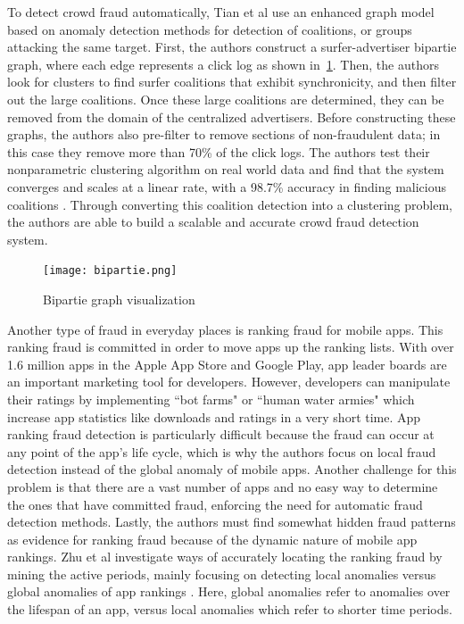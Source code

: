 \documentclass[midd]{thesis}
\begin{document}
To detect crowd fraud automatically, Tian et al use an enhanced graph model based on anomaly detection methods for detection of coalitions, or groups attacking the same target. First, the authors construct a surfer-advertiser bipartie graph, where each edge represents a click log as shown in~\ref{fig:bipartie}. Then, the authors look for clusters to find surfer coalitions that exhibit synchronicity, and then filter out the large coalitions. Once these large coalitions are determined, they can be removed from the domain of the centralized advertisers. Before constructing these graphs, the authors also pre-filter to remove sections of non-fraudulent data; in this case they remove more than 70\% of the click logs. The authors test their nonparametric clustering algorithm on real world data and find that the system converges and scales at a linear rate, with a 98.7\% accuracy in finding malicious coalitions \cite{Tian}. Through converting this coalition detection into a clustering problem, the authors are able to build a scalable and accurate crowd fraud detection system. 

\begin{figure} %
  \texttt{[image: bipartie.png]}
  \caption{Bipartie graph visualization \cite{Tian}}
  \label{fig:bipartie}
\end{figure}

Another type of fraud in everyday places is ranking fraud for mobile apps. This ranking fraud is committed in order to move apps up the ranking lists. With over 1.6 million apps in the Apple App Store and Google Play, app leader boards are an important marketing tool for developers. However, developers can manipulate their ratings by implementing ``bot farms" or ``human water armies" which increase app statistics like downloads and ratings in a very short time. App ranking fraud detection is particularly difficult because the fraud can occur at any point of the app's life cycle, which is why the authors focus on local fraud detection instead of the global anomaly of mobile apps. Another challenge for this problem is that there are a vast number of apps and no easy way to determine the ones that have committed fraud, enforcing the need for automatic fraud detection methods. Lastly, the authors must find somewhat hidden fraud patterns as evidence for ranking fraud because of the dynamic nature of mobile app rankings. Zhu et al investigate ways of accurately locating the ranking fraud by mining the active periods, mainly focusing on detecting local anomalies versus global anomalies of app rankings \cite{Zhu2015}. Here, global anomalies refer to anomalies over the lifespan of an app, versus local anomalies which refer to shorter time periods. 
\end{document}
